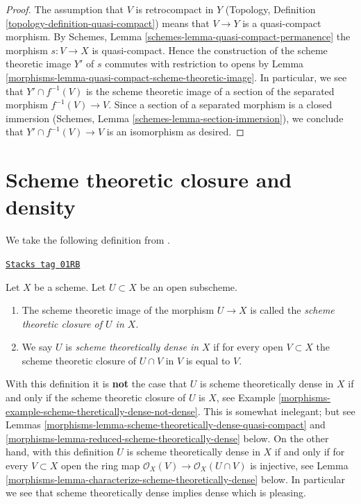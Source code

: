 \begin{proof}

The assumption that $V$ is retrocompact in $Y$
(Topology, Definition \ref{topology-definition-quasi-compact})
means that $V \to Y$ is a quasi-compact morphism.
By Schemes, Lemma \ref{schemes-lemma-quasi-compact-permanence}
the morphism $s : V \to X$ is quasi-compact.
Hence the construction of the scheme theoretic image $Y'$
of $s$ commutes with restriction to opens by
Lemma \ref{morphisms-lemma-quasi-compact-scheme-theoretic-image}.
In particular, we see that $Y' \cap f^{-1}(V)$ is the
scheme theoretic image of a section of the separated
morphism $f^{-1}(V) \to V$. Since a section of a separated
morphism is a closed immersion
(Schemes, Lemma \ref{schemes-lemma-section-immersion}),
we conclude that
$Y' \cap f^{-1}(V) \to V$ is an isomorphism as desired.
\end{proof}

\section{Scheme theoretic closure and density}
\label{morphisms-section-scheme-theoretic-closure}
We take the following definition from \cite[IV, Definition 11.10.2]{EGA}.

\begin{definition}
\label{morphisms-definition-scheme-theoretically-dense}
\href{https://stacks.math.columbia.edu/tag/01RB}{\texttt{Stacks tag 01RB}}

Let $X$ be a scheme. Let $U \subset X$ be an open subscheme.
\begin{enumerate}
\item The scheme theoretic image of the morphism $U \to X$
is called the {\it scheme theoretic closure of $U$ in $X$}.
\item We say $U$ is {\it scheme theoretically dense in $X$}
if for every open $V \subset X$ the scheme theoretic closure
of $U \cap V$ in $V$ is equal to $V$.
\end{enumerate}
\end{definition}

With this definition it is
{\bf not} the case that $U$ is scheme theoretically dense in $X$ if and
only if the scheme theoretic closure of $U$ is $X$, see
Example \ref{morphisms-example-scheme-theretically-dense-not-dense}.
This is somewhat inelegant; but see
Lemmas \ref{morphisms-lemma-scheme-theoretically-dense-quasi-compact} and
\ref{morphisms-lemma-reduced-scheme-theoretically-dense}
below. On the other hand, with this definition $U$ is scheme theoretically
dense in $X$ if and only if for every $V \subset X$ open the ring map
$\mathcal{O}_X(V) \to \mathcal{O}_X(U \cap V)$ is injective, see
Lemma \ref{morphisms-lemma-characterize-scheme-theoretically-dense}
below. In particular we see that scheme theoretically dense implies dense
which is pleasing.

